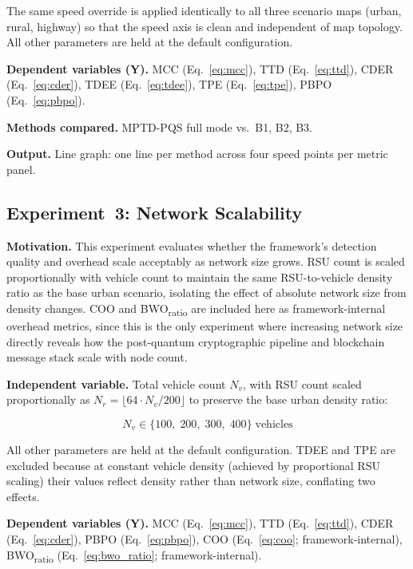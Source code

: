 \documentclass[12pt, a4paper]{report}
\begin{document}
The same speed override is applied identically to all three
scenario maps (urban, rural, highway) so that the speed axis is
clean and independent of map topology. All other parameters are
held at the default configuration.

\textbf{Dependent variables (Y).}
MCC (Eq.~\ref{eq:mcc}),
TTD (Eq.~\ref{eq:ttd}),
CDER (Eq.~\ref{eq:cder}),
TDEE (Eq.~\ref{eq:tdee}),
TPE (Eq.~\ref{eq:tpe}),
PBPO (Eq.~\ref{eq:pbpo}).

\textbf{Methods compared.}
MPTD-PQS full mode vs.\ B1, B2, B3.

\textbf{Output.}
Line graph: one line per method across four speed points per
metric panel.

\subsection{Experiment~3: Network Scalability}
\label{sec:exp3}

\textbf{Motivation.}
This experiment evaluates whether the framework's detection
quality and overhead scale acceptably as network size grows.
RSU count is scaled proportionally with vehicle count to maintain
the same RSU-to-vehicle density ratio as the base urban scenario,
isolating the effect of absolute network size from density changes.
COO and BWO\textsubscript{ratio} are included here as
framework-internal overhead metrics, since this is the only
experiment where increasing network size directly reveals how
the post-quantum cryptographic pipeline and blockchain message
stack scale with node count.

\textbf{Independent variable.}
Total vehicle count $N_v$, with RSU count scaled proportionally
as $N_r = \lfloor 64 \cdot N_v / 200 \rfloor$ to preserve the
base urban density ratio:

\begin{equation}
  N_v \in \{100,\; 200,\; 300,\; 400\}
  \;\text{vehicles}
  \label{eq:exp3-x}
\end{equation}

All other parameters are held at the default configuration.
TDEE and TPE are excluded because at constant vehicle density
(achieved by proportional RSU scaling) their values reflect
density rather than network size, conflating two effects.

\textbf{Dependent variables (Y).}
MCC (Eq.~\ref{eq:mcc}),
TTD (Eq.~\ref{eq:ttd}),
CDER (Eq.~\ref{eq:cder}),
PBPO (Eq.~\ref{eq:pbpo}),
COO (Eq.~\ref{eq:coo}; framework-internal),
BWO\textsubscript{ratio} (Eq.~\ref{eq:bwo_ratio};
framework-internal).
\end{document}
